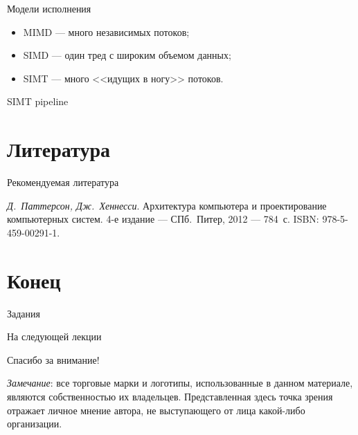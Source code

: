 \begin{frame}{Модели исполнения}
\begin{itemize}
    \item MIMD --- много независимых потоков;
    \item SIMD --- один тред с широким объемом данных;
    \item SIMT --- много <<идущих в ногу>> потоков.
\end{itemize}
\end{frame}

\begin{frame}{SIMT pipeline}
\centering
{}
\end{frame}

\section*{Литература}

\begin{frame}{Рекомендуемая литература}
\begin{thebibliography}{99}
    \bibitem{} \textit{Д.~Паттерсон, Дж.~Хеннесси}. Архитектура компьютера и
    проектирование компьютерных систем. 4-е издание --- СПб.~Питер, 2012 ---
    784~с. ISBN: 978-5-459-00291-1.
\end{thebibliography}
\end{frame}

\section*{Конец}

\begin{frame}{Задания}
\end{frame}

\begin{frame}{На следующей лекции}
\end{frame}

\begin{frame}

{\huge{Спасибо за внимание!}\par}

\vfill

\tiny{\textit{Замечание}: все торговые марки и логотипы, использованные в данном материале, являются собственностью их владельцев. Представленная здесь точка зрения отражает личное мнение автора, не выступающего от лица какой-либо организации.}

\end{frame}


